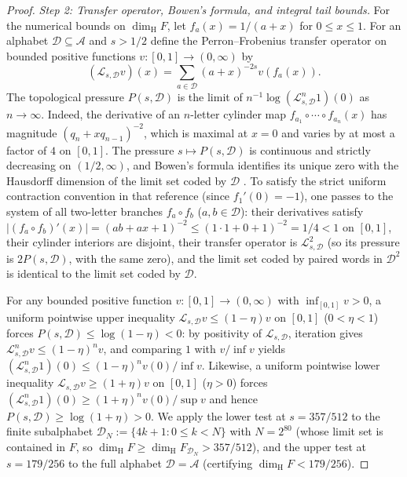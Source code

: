 \documentclass[11pt]{article}
\theoremstyle{definition}
\theoremstyle{remark}
\newcommand{\dimH}{\dim_{\mathrm{H}}}
\begin{document}
\begin{proof}
\emph{Step 2: Transfer operator, Bowen's formula, and integral tail bounds.}
For the numerical bounds on $\dimH F$, let $f_a(x)=1/(a+x)$ for $0\le x\le1$.
For an alphabet $\mathcal D\subseteq\mathcal A$ and $s>1/2$ define the
Perron--Frobenius transfer operator on bounded positive functions $v:[0,1]\to(0,\infty)$
by
\[
 (\mathcal L_{s,\mathcal D}v)(x)
   =\sum_{a\in\mathcal D}(a+x)^{-2s}v(f_a(x)).
\]
The topological pressure $P(s,\mathcal D)$ is the limit of
$n^{-1}\log(\mathcal L_{s,\mathcal D}^n1)(0)$ as $n\to\infty$.
Indeed, the derivative of an $n$-letter cylinder map
$f_{a_1}\circ\cdots\circ f_{a_n}(x)$ has magnitude $(q_n+xq_{n-1})^{-2}$, which
is maximal at $x=0$ and varies by at most a factor of $4$ on $[0,1]$. The
pressure $s\mapsto P(s,\mathcal D)$ is continuous and strictly decreasing on
$(1/2,\infty)$, and Bowen's formula identifies its unique zero with the
Hausdorff dimension of the limit set coded by $\mathcal D$
\cite[\S2, Theorem~2.3]{CLU}. To satisfy the strict uniform contraction
convention in that reference (since $f_1'(0)=-1$), one passes to the system of
all two-letter branches $f_a\circ f_b$ ($a,b\in\mathcal D$): their derivatives
satisfy $|(f_a\circ f_b)'(x)|=(ab+ax+1)^{-2}\le(1\cdot1+0+1)^{-2}=1/4<1$ on
$[0,1]$, their cylinder interiors are disjoint, their transfer operator is
$\mathcal L_{s,\mathcal D}^2$ (so its pressure is $2P(s,\mathcal D)$, with the
same zero), and the limit set coded by paired words in $\mathcal D^2$ is
identical to the limit set coded by $\mathcal D$.

For any bounded positive function $v:[0,1]\to(0,\infty)$ with
$\inf_{[0,1]}v>0$, a uniform pointwise upper inequality
$\mathcal L_{s,\mathcal D}v\le(1-\eta)v$ on $[0,1]$ ($0<\eta<1$) forces
$P(s,\mathcal D)\le\log(1-\eta)<0$: by positivity of $\mathcal L_{s,\mathcal D}$,
iteration gives $\mathcal L_{s,\mathcal D}^n v\le(1-\eta)^n v$, and comparing $1$
with $v/\inf v$ yields
$(\mathcal L_{s,\mathcal D}^n1)(0)\le(1-\eta)^n v(0)/\inf v$.
Likewise, a uniform pointwise lower inequality
$\mathcal L_{s,\mathcal D}v\ge(1+\eta)v$ on $[0,1]$ ($\eta>0$) forces
$(\mathcal L_{s,\mathcal D}^n1)(0)\ge(1+\eta)^n v(0)/\sup v$ and hence
$P(s,\mathcal D)\ge\log(1+\eta)>0$. We apply the lower test at $s=357/512$ to
the finite subalphabet $\mathcal D_N:=\{4k+1:0\le k<N\}$ with $N=2^{80}$ (whose
limit set is contained in $F$, so $\dimH F\ge\dimH F_{\mathcal D_N}>357/512$),
and the upper test at $s=179/256$ to the full alphabet $\mathcal D=\mathcal A$
(certifying $\dimH F<179/256$).


\end{proof}
\end{document}
